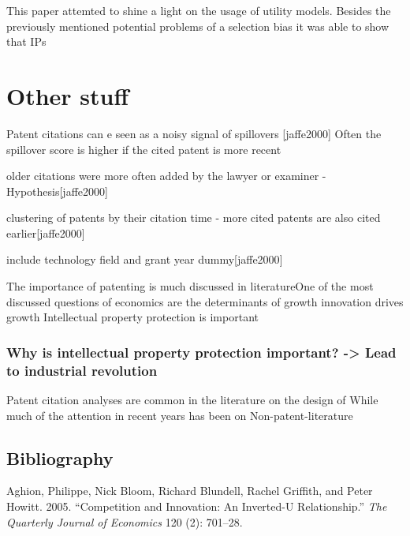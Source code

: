 \documentclass[
  12pt,
]{article}
\begin{document}
This paper attemted to shine a light on the usage of utility models.
Besides the previously mentioned potential problems of a selection bias
it was able to show that IPs

\hypertarget{other-stuff}{%
\section{Other stuff}\label{other-stuff}}

Patent citations can e seen as a noisy signal of spillovers
{[}jaffe2000{]} Often the spillover score is higher if the cited patent
is more recent

older citations were more often added by the lawyer or examiner -
Hypothesis{[}jaffe2000{]}

clustering of patents by their citation time - more cited patents are
also cited earlier{[}jaffe2000{]}

include technology field and grant year dummy{[}jaffe2000{]}

The importance of patenting is much discussed in literatureOne of the
most discussed questions of economics are the determinants of growth
innovation drives growth Intellectual property protection is important

\hypertarget{why-is-intellectual-property-protection-important---lead-to-industrial-revolution}{%
\subsubsection{Why is intellectual property protection important?
-\textgreater{} Lead to industrial
revolution}\label{why-is-intellectual-property-protection-important---lead-to-industrial-revolution}}

Patent citation analyses are common in the literature on the design of
While much of the attention in recent years has been on
Non-patent-literature

\newpage

\hypertarget{bibliography}{%
\subsection*{Bibliography}\label{bibliography}}

\hypertarget{refs}{}
\leavevmode\hypertarget{ref-aghionCompetitionInnovationInvertedU2005}{}%
Aghion, Philippe, Nick Bloom, Richard Blundell, Rachel Griffith, and
Peter Howitt. 2005. ``Competition and Innovation: An Inverted-U
Relationship.'' \emph{The Quarterly Journal of Economics} 120 (2):
701--28.
\end{document}
